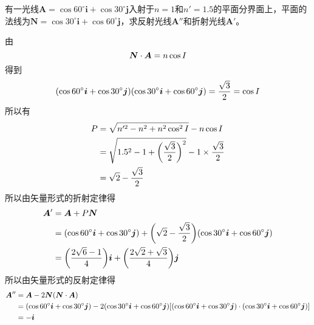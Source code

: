\documentclass[cn,10pt,chinesefont=founder,math=newtx,cite=super,twoside]{elegantbook}
\begin{document}
\begin{problem}
	有一光线$\boldsymbol{A}=\cos 60^{\circ}\boldsymbol{i}+\cos 30^{\circ}\boldsymbol{j}$入射于$n=1$和$n'=1.5$的平面分界面上，平面的法线为$\boldsymbol{N}=\cos 30^{\circ}\boldsymbol{i}+\cos 60^{\circ}\boldsymbol{j}$，求反射光线$\boldsymbol{A}''$和折射光线$\boldsymbol{A}'$。
\end{problem}
\begin{solution}
	由
	\begin{equation}
	\boldsymbol{N}\cdot\boldsymbol{A}=n\cos I\notag
	\end{equation}
	得到
	\begin{equation}
	(\cos 60^{\circ}\boldsymbol{i}+\cos 30^{\circ}\boldsymbol{j})(\cos 30^{\circ}\boldsymbol{i}+\cos 60^{\circ}\boldsymbol{j})=\frac{\sqrt{3}}{2}=\cos I\notag
	\end{equation}
	所以有
	\begin{equation}
	\begin{aligned}
	P&=\sqrt{n'^2-n^2+n^2\cos^2 I}-n\cos I\\
	&=\sqrt{1.5^2-1+\bigg(\frac{\sqrt{3}}{2}\bigg)^2}-1\times\frac{\sqrt{3}}{2}\\
	&=\sqrt{2}-\frac{\sqrt{3}}{2}\notag
	\end{aligned}
	\end{equation}
	所以由矢量形式的折射定律得
	\begin{equation}
	\begin{aligned}
	\boldsymbol{A}'&=\boldsymbol{A}+P\boldsymbol{N}\\
	&=(\cos 60^{\circ}\boldsymbol{i}+\cos 30^{\circ}\boldsymbol{j})+\bigg(\sqrt{2}-\frac{\sqrt{3}}{2}\bigg)(\cos 30^{\circ}\boldsymbol{i}+\cos 60^{\circ}\boldsymbol{j})\\
	&=\bigg(\frac{2\sqrt{6}-1}{4}\bigg)\boldsymbol{i}+\bigg(\frac{2\sqrt{2}+\sqrt{3}}{4}\bigg)\boldsymbol{j}\notag
	\end{aligned}
	\end{equation}
	所以由矢量形式的反射定律得
	\begin{equation}
	\begin{aligned}
	\boldsymbol{A}''&=\boldsymbol{A}-2\boldsymbol{N}(\boldsymbol{N}\cdot\boldsymbol{A})\\
	&=(\cos 60^{\circ}\boldsymbol{i}+\cos 30^{\circ}\boldsymbol{j})-2(\cos 30^{\circ}\boldsymbol{i}+\cos 60^{\circ}\boldsymbol{j})[(\cos 60^{\circ}\boldsymbol{i}+\cos 30^{\circ}\boldsymbol{j})\cdot(\cos 30^{\circ}\boldsymbol{i}+\cos 60^{\circ}\boldsymbol{j})]\\
	&=-\boldsymbol{i}\notag
	\end{aligned}
	\end{equation}
\end{solution}
\end{document}
